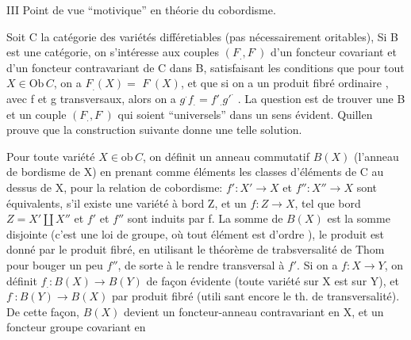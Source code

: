 


III   Point de vue ``motivique'' en théorie du cobordisme.

Soit C la catégorie des variétés différetiables (pas nécessairement
oritables),  Si B est une catégorie, on s'intéresse aux couples
$(F_{.},F^{\cdot})$ d'un foncteur covariant et d'un foncteur contravariant de C
dans B, satisfaisant les conditions que pour tout $X\in\mathrm{Ob}\,C$, on a $F_{.}(X)=$
$F^{\cdot}(X)$, et que si on a un produit fibré ordinaire
,
avec f et g transversaux, alors on a $g^{\cdot}f_{.} = f'_{.}g'^{\cdot}$ . La question est
de trouver une B et un couple $(F_{.},F^{\cdot})$ qui soient ``universels'' dans un
sens évident. Quillen prouve que la construction suivante donne une
telle solution.

Pour toute variété $X\in\mathrm{ob}\,C$, on définit un anneau commutatif
$B(X)$ (l'anneau de bordisme de X) en prenant comme éléments les classes
 d'éléments de C au dessus de X, pour la relation de cobordisme:
$f':X'\to X$ et $f'':X''\to X$ sont équivalents, s'il existe une variété à bord
Z, et un $f:Z\to X$, tel que bord $Z = X'\amalg X''$ et $f'$ et $f''$ sont induits
par f. La somme de $B(X)$ est la somme disjointe (c'est une loi de groupe,
 où tout élément est d'ordre  ), le produit est
donné par le produit fibré, en utilisant le théorème de trabsversalité
de Thom pour bouger un peu $f''$, de sorte à le rendre transversal à $f'$.
Si on a $f: X\to Y$, on définit $f_{.} : B(X)\to B(Y)$ de façon évidente (toute
variété sur X est sur Y), et $f^{\cdot}: B(Y)\to B(X)$ par produit fibré (utili\unsure{\deleted{(}-|(-}
sant encore le th. de transversalité). De cette façon, $B(X)$ devient un
foncteur-anneau  contravariant en X, et un foncteur groupe covariant en

